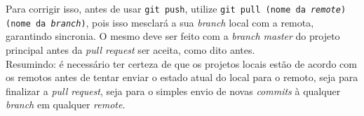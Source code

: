 \documentclass[a4paper,oneside,10pt]{memoir}
\begin{document}
Para corrigir isso, antes de usar \texttt{git push}, utilize \texttt{git pull
(nome da \emph{re\-mo\-te}) (nome da \emph{branch})}, pois isso mesclará a sua
\emph{branch} local com a remota, garantindo sincronia. O mesmo deve ser feito
com a \emph{branch master} do projeto principal antes da \emph{pull request} ser
aceita, como dito antes.
\\

Resumindo: é necessário ter certeza de que os projetos locais estão de
a\-cor\-do com os remotos antes de tentar enviar o estado atual do local para o
remoto, seja para finalizar a \emph{pull request}, seja para o simples envio de
novas \emph{commits} à qualquer \emph{branch} em qualquer \emph{remote}.
\end{document}
